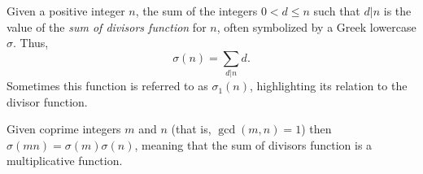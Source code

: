 \documentclass[12pt]{article}
\begin{document}
Given a positive integer $n$, the sum of the integers $0 < d \le n$ such that $d|n$ is the value of the {\em sum of divisors function} for $n$, often symbolized by a  Greek lowercase $\sigma$. Thus, $$\sigma(n) = \sum_{d|n} d.$$ Sometimes this function is referred to as $\sigma_1(n)$, highlighting its relation to the divisor function.

Given coprime integers $m$ and $n$ (that is, $\gcd(m, n) = 1$) then $\sigma(mn) = \sigma(m)\sigma(n)$, meaning that the sum of divisors function is a multiplicative function.

\end{document}
